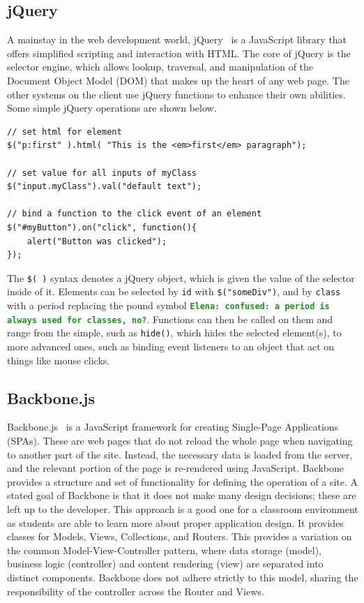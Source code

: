 \documentclass[12pt]{article}
\newcommand{\comment}[1]{{\bf \tt  {#1}}}
\newcommand{\emcomment}[1]{\textcolor{ForestGreen}{\comment{Elena: {#1}}}}
\newcommand{\code}[1]{{\texttt {#1}}}
\begin{document}
\subsection{jQuery}\label{sec:jquery}
A mainstay in the web development world, jQuery~\cite{jQuery} is a JavaScript library that offers simplified scripting and interaction with HTML. The core of jQuery is the selector engine, which allows lookup, traversal, and manipulation of the Document Object Model (DOM) that makes up the heart of any web page. The other systems on the client use jQuery functions to enhance their own abilities. Some simple jQuery operations are shown below.
\begin{verbatim}
// set html for element
$("p:first" ).html( "This is the <em>first</em> paragraph");

// set value for all inputs of myClass
$("input.myClass").val("default text");

// bind a function to the click event of an element
$("#myButton").on("click", function(){
    alert("Button was clicked");
});
\end{verbatim}
The \code{\$( )} syntax denotes a jQuery object, which is given the value of the selector inside of it. Elements can be selected by \code{id} with \code{\$("someDiv")}, and by \code{class} with a period replacing the pound symbol \emcomment{confused: a period is always used for classes, no?}. Functions can then be called on them and range from the simple, such as \code{hide()}, which hides the selected element(s), to more advanced ones, such as binding event listeners to an object that act on things like mouse clicks.


\subsection{Backbone.js}\label{sec:backbone}
Backbone.js~\cite{Backbone} is a JavaScript framework for creating Single-Page Applications (SPAs). These are web pages that do not reload the whole page when navigating to another part of the site. Instead, the necessary data is loaded from the server, and the relevant portion of the page is re-rendered using JavaScript. Backbone provides a structure and set of functionality for defining the operation of a site. A stated goal of Backbone is that it does not make many design decisions; these are left up to the developer. This approach is a good one for a classroom environment as students are able to learn more about proper application design. It provides classes for Models, Views, Collections, and Routers. This provides a variation on the common Model-View-Controller pattern, where data storage (model), business logic (controller) and content rendering (view) are separated into distinct components. Backbone does not adhere strictly to this model, sharing the responsibility of the controller across the Router and Views.
\end{document}
